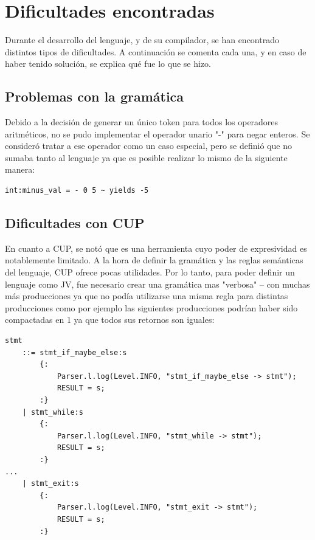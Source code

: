 \documentclass[spanish]{article}
\begin{document}
    \section{Dificultades encontradas}
        \par Durante el desarrollo del lenguaje, y de su compilador, se han encontrado distintos tipos de dificultades. A continuación se comenta cada una, y en caso de haber tenido solución, se explica qué fue lo que se hizo.

        \subsection{Problemas con la gramática}
            \par Debido a la decisión de generar un único token para todos los operadores aritméticos, no se pudo implementar el operador unario "-" para negar enteros. Se consideró tratar a ese operador como un caso especial, pero se definió que no sumaba tanto al lenguaje ya que es posible realizar lo mismo de la siguiente manera:
            \begin{lstlisting}
int:minus_val = - 0 5 ~ yields -5
            \end{lstlisting} 

        \subsection{Dificultades con CUP}
            \par En cuanto a CUP, se notó que es una herramienta cuyo poder de expresividad es notablemente limitado. A la hora de definir la gramática y las reglas semánticas del lenguaje, CUP ofrece pocas utilidades. Por lo tanto, para poder definir un lenguaje como JV, fue necesario crear una gramática mas "verbosa" – con muchas más producciones ya que no podía utilizarse una misma regla para distintas producciones como por ejemplo las siguientes producciones podrían haber sido compactadas en 1 ya que todos sus retornos son iguales:
            \begin{lstlisting}
stmt
	::= stmt_if_maybe_else:s
		{:
			Parser.l.log(Level.INFO, "stmt_if_maybe_else -> stmt");
			RESULT = s;
		:}
	| stmt_while:s
		{:
			Parser.l.log(Level.INFO, "stmt_while -> stmt");
			RESULT = s;
		:}
...
	| stmt_exit:s
		{:
			Parser.l.log(Level.INFO, "stmt_exit -> stmt");
			RESULT = s;
		:}
            \end{lstlisting}
\end{document}
